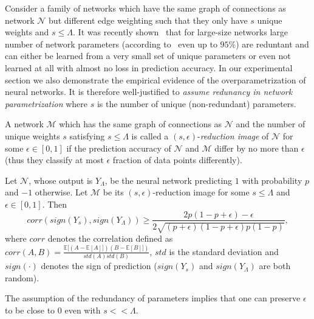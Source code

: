 \documentclass[twoside]{article}
\begin{document}
Consider a family of networks which have the same graph of connections as network $\mathcal{N}$ but different edge weighting such that they only have $s$ unique weights and $s \leq \Lambda$. It was recently shown~\cite{NIPS2013_5025,DBLP:journals/corr/DentonZBLF14} that for large-size networks large number of network parameters (according to~\cite{NIPS2013_5025} even up to $95\%$) are reduntant and can either be learned from a very small set of unique parameters or even not learned at all with almost no loss in prediction accuracy.  In our experimental section we also demonstrate the empirical evidence of the overparametrization of neural networks. It is therefore well-justified to \textit{assume redunancy in network parametrization} where $s$ is the number of unique (non-redundant) parameters.

\begin{definition}
A network $\mathcal{M}$ which has the same graph of connections as $\mathcal{N}$ and the number of unique weights $s$ satisfying $s \leq \Lambda$ is called a $(s,\epsilon)$-\textit{reduction image} of $\mathcal{N}$ for some $\epsilon \in [0,1]$ if the prediction accuracy of $\mathcal{N}$ and $\mathcal{M}$ differ by no more than $\epsilon$ (thus they classify at most $\epsilon$ fraction of data points differently).
\end{definition}

\begin{theorem}
Let $\mathcal{N}$, whose output is $Y_{\Lambda}$, be the neural network predicting $1$ with probability $p$ and $-1$ otherwise. Let $\mathcal{M}$ be its $(s,\epsilon)$-reduction image for some $s \leq \Lambda$ and $\epsilon \in [0,1]$. Then
\[corr(sign(Y_s),sign(Y_{\Lambda})) \geq \frac{2p(1 \!-\! p \!+\! \epsilon) \!-\! \epsilon}{2\sqrt{(p \!+\! \epsilon)(1 \!-\! p \!+\! \epsilon)p(1 \!-\! p)}},
\]
where $corr$ denotes the correlation defined as $corr(A,B) = \frac{\mathbb{E}[(A - \mathbb{E}[A]])(B - \mathbb{E}[B]])}{std(A)std(B)}$, $std$ is the standard deviation and $sign(\cdot)$ denotes the sign of prediction ($sign(Y_s)$ and $sign(Y_{\Lambda})$ are both random).
\label{thm:redun}
\end{theorem}

The assumption of the redundancy of parameters implies that one can preserve $\epsilon$ to be close to $0$ even with $s << \Lambda$.
\end{document}
